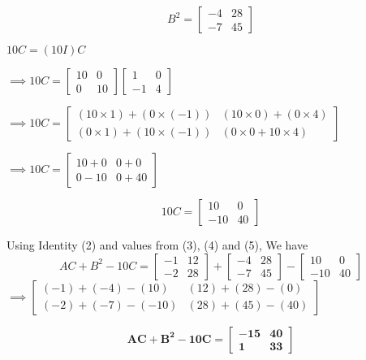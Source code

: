 \documentclass[journal,12pt,twocolumn]{IEEEtran}
\begin{document}
      \begin{equation}
      \boxed{B^2=
      \begin{bmatrix}
        -4 & 28 \\
        -7 & 45 
      \end{bmatrix}
      }
    \end{equation}
    
      $
      10C=(10I)C 
      $

      $\implies 10C=
      \begin{bmatrix}
        10 & 0 \\
        0 & 10
      \end{bmatrix}
      \begin{bmatrix}
        1 & 0 \\
        -1 & 4
      \end{bmatrix}
      $

      $\implies 10C=
      \begin{bmatrix}
        (10\times1)+(0\times(-1)) & (10\times0)+(0\times4) \\
        (0\times1)+(10\times(-1)) & (0\times0+10\times4)
      \end{bmatrix}
      $

      $\implies 10C=
      \begin{bmatrix}
        10+0 & 0+0 \\
        0-10 & 0+40
      \end{bmatrix}
      $

      \begin{equation}
      \boxed{10C=
      \begin{bmatrix}
        10 & 0 \\
        -10 & 40
      \end{bmatrix}
      }
    \end{equation}
  
    
    Using Identity (2) and values from (3), (4) and (5), We have
    $$
      AC+B^2-10C= 
      \begin{bmatrix}
        -1 & 12 \\
        -2 & 28
      \end{bmatrix}
      +
      \begin{bmatrix}
        -4 & 28 \\
        -7 & 45
      \end{bmatrix}
      -
      \begin{bmatrix}
        10 & 0 \\
        -10 & 40
      \end{bmatrix}
    $$
    $\implies
      \begin{bmatrix}
        (-1)+(-4)-(10) & (12)+(28)-(0) \\
        (-2)+(-7)-(-10) & (28)+(45)-(40)
      \end{bmatrix}
    $
    
    \begin{equation}
      \boxed{\mathbf{AC+B^2-10C} =
        \begin{bmatrix}
          \mathbf{-15} & \mathbf{40} \\
          \mathbf{1} & \mathbf{33}
        \end{bmatrix}
        }  
    \end{equation}
\end{document}
